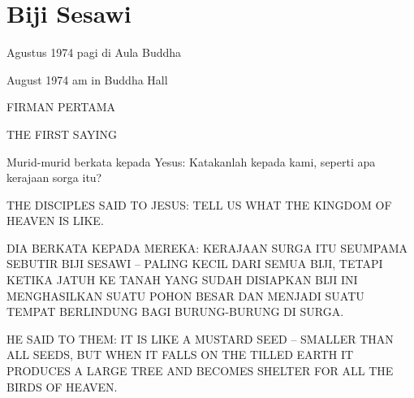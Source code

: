 \chapter{Biji Sesawi}

 Agustus 1974 pagi di Aula Buddha

 August 1974 am in Buddha Hall

\bahasa
FIRMAN PERTAMA

\english
THE FIRST SAYING

\bahasa
Murid-murid berkata kepada Yesus: Katakanlah kepada kami, seperti apa kerajaan sorga itu?

\english
THE DISCIPLES SAID TO JESUS: TELL US WHAT THE KINGDOM OF HEAVEN IS LIKE.

\bahasa
DIA BERKATA KEPADA MEREKA: KERAJAAN SURGA ITU SEUMPAMA SEBUTIR BIJI SESAWI -- PALING KECIL DARI SEMUA BIJI, TETAPI KETIKA JATUH KE TANAH YANG SUDAH DISIAPKAN BIJI INI MENGHASILKAN SUATU POHON BESAR DAN MENJADI SUATU TEMPAT BERLINDUNG BAGI BURUNG-BURUNG DI SURGA.

\english
HE SAID TO THEM: IT IS LIKE A MUSTARD SEED -- SMALLER THAN ALL SEEDS, BUT WHEN
IT FALLS ON THE TILLED EARTH IT PRODUCES A LARGE TREE AND BECOMES SHELTER
FOR ALL THE BIRDS OF HEAVEN.

\bahasa





